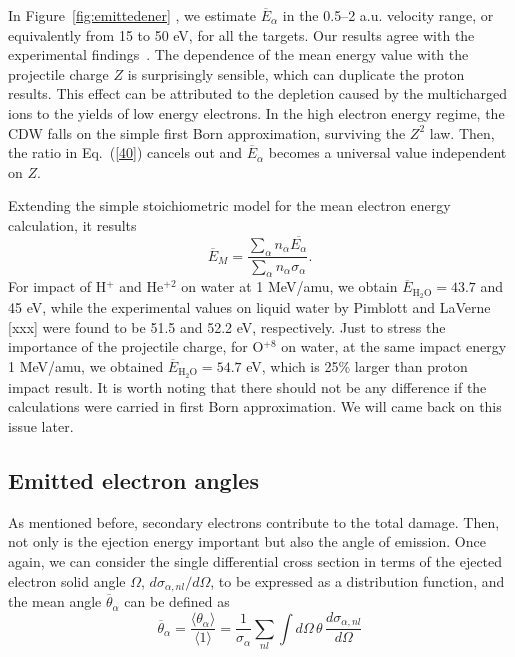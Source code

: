 \documentclass[preprint,12pt]{article}
\begin{document}
In Figure~\ref{fig:emittedener} , we estimate $\overline{E}_{\alpha}$ in the 0.5--2 a.u.
velocity range, or equivalently from 15 to 50 eV, for all the targets.
Our results agree with the experimental findings~\cite{surdutovic2018}. 
The dependence of the mean energy value with the projectile charge $Z$ 
is surprisingly sensible, which can duplicate the proton results. 
This effect can be attributed to the depletion caused by the 
multicharged ions to the yields of low energy electrons. In the high 
electron energy regime, the CDW falls on the simple first Born 
approximation, surviving the $Z^{2}$ law. Then, the ratio in 
Eq.~(\ref{40}) cancels out and $\overline{E}_{\alpha}$ becomes a 
universal value independent on $Z$.

Extending the simple stoichiometric model for the mean electron energy
calculation, it results
\begin{equation}
\overline{E}_{M}=\frac{\sum\limits_{\alpha}n_{\alpha}
\overline{E_{\alpha}}}{\sum\limits_{\alpha}n_{\alpha}\sigma_{\alpha}}.
\label{70}
\end{equation}
For impact of H$^{+}$ and He$^{+2}$ on water at 1 MeV/amu, we obtain 
$\overline{E}_{\text{H}_{2}\text{O}}=43.7$ and 45 eV, while the 
experimental values 
on liquid water by Pimblott and LaVerne [xxx] were found to be 51.5 and 
52.2 eV, respectively. Just to stress the importance of the projectile 
charge, for O$^{+8}$ on water, at the same impact energy 1 MeV/amu, 
we obtained $\overline{E}_{\text{H}_{2}\text{O}}=54.7$ eV, which is 25\% 
larger than proton impact result. It is worth noting that there should 
not be any difference if the calculations were carried in first Born 
approximation. We will came back on this issue later.

\subsection{Emitted electron angles}

As mentioned before, secondary electrons contribute to the total damage. 
Then, not only is the ejection energy important but also the angle 
of emission. Once again, we can consider the single differential cross 
section in terms of the ejected electron solid angle $\Omega$, 
$d\sigma_{\alpha,nl}/d\Omega$, to be expressed as a distribution function, 
and the mean angle $\overline{\theta}_{\alpha}$ can be defined as
\begin{equation}
\overline{\theta}_{\alpha}=\frac{\langle\theta_{\alpha}\rangle}
{\langle 1\rangle}=\frac{1}{\sigma_{\alpha}}\sum\limits_{nl}
\int d\Omega\,\theta\,\frac{d\sigma_{\alpha,nl}}{d\Omega}
\end{equation}
\end{document}
